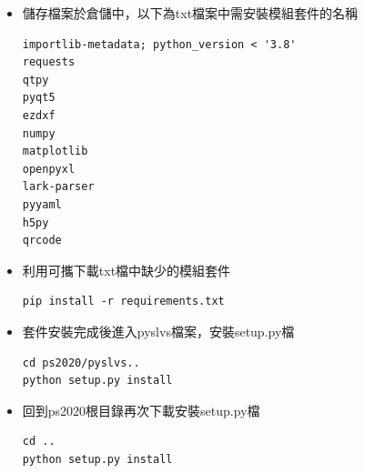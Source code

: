 \documentclass[14pt,a4paper]{report}  %
\begin{document}
		\begin{itemize}
		\item 儲存檔案於倉儲中，以下為txt檔案中需安裝模組套件的名稱
		\begin{lstlisting}[caption=安裝模組套件]
importlib-metadata; python_version < '3.8'
requests
qtpy
pyqt5
ezdxf
numpy
matplotlib
openpyxl
lark-parser
pyyaml
h5py
qrcode
		\end{lstlisting}
		\end{itemize}
		
		\begin{itemize}
		\item 利用可攜下載txt檔中缺少的模組套件
		\begin{lstlisting}[caption=安裝模組套件指令]
pip install -r requirements.txt
		\end{lstlisting}
		\end{itemize}
		
		\begin{itemize}
		\item 套件安裝完成後進入pyslvs檔案，安裝setup.py檔
		\begin{lstlisting}[caption=安裝步驟]
cd ps2020/pyslvs..
python setup.py install
		\end{lstlisting}
		\end{itemize}
		
		\begin{itemize}
		\item 回到ps2020根目錄再次下載安裝setup.py檔
		\begin{lstlisting}[caption=安裝步驟]
cd ..
python setup.py install
		\end{lstlisting}
		\end{itemize}
		
\end{document}
